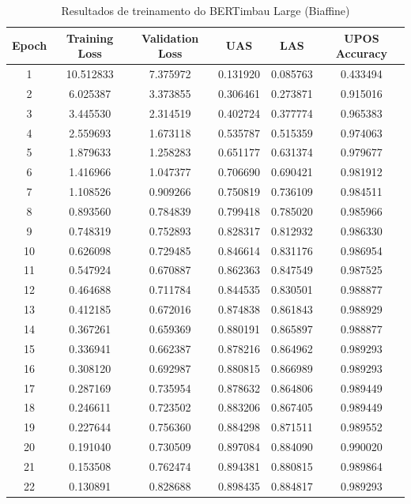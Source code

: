 \begin{table}[ht]
\centering
\caption{Resultados de treinamento do BERTimbau Large (Biaffine)}
\label{tab:bertimbau-large-biaffine}
\begin{tabular}{c c c c c c}
\hline
\textbf{Epoch} & \textbf{Training Loss} & \textbf{Validation Loss} & \textbf{UAS} & \textbf{LAS} & \textbf{UPOS Accuracy} \\
\hline
1 & 10.512833 & 7.375972 & 0.131920 & 0.085763 & 0.433494 \\
2 & 6.025387 & 3.373855 & 0.306461 & 0.273871 & 0.915016 \\
3 & 3.445530 & 2.314519 & 0.402724 & 0.377774 & 0.965383 \\
4 & 2.559693 & 1.673118 & 0.535787 & 0.515359 & 0.974063 \\
5 & 1.879633 & 1.258283 & 0.651177 & 0.631374 & 0.979677 \\
6 & 1.416966 & 1.047377 & 0.706690 & 0.690421 & 0.981912 \\
7 & 1.108526 & 0.909266 & 0.750819 & 0.736109 & 0.984511 \\
8 & 0.893560 & 0.784839 & 0.799418 & 0.785020 & 0.985966 \\
9 & 0.748319 & 0.752893 & 0.828317 & 0.812932 & 0.986330 \\
10 & 0.626098 & 0.729485 & 0.846614 & 0.831176 & 0.986954 \\
11 & 0.547924 & 0.670887 & 0.862363 & 0.847549 & 0.987525 \\
12 & 0.464688 & 0.711784 & 0.844535 & 0.830501 & 0.988877 \\
13 & 0.412185 & 0.672016 & 0.874838 & 0.861843 & 0.988929 \\
14 & 0.367261 & 0.659369 & 0.880191 & 0.865897 & 0.988877 \\
15 & 0.336941 & 0.662387 & 0.878216 & 0.864962 & 0.989293 \\
16 & 0.308120 & 0.692987 & 0.880815 & 0.866989 & 0.989293 \\
17 & 0.287169 & 0.735954 & 0.878632 & 0.864806 & 0.989449 \\
18 & 0.246611 & 0.723502 & 0.883206 & 0.867405 & 0.989449 \\
19 & 0.227644 & 0.756360 & 0.884298 & 0.871511 & 0.989552 \\
20 & 0.191040 & 0.730509 & 0.897084 & 0.884090 & 0.990020 \\
21 & 0.153508 & 0.762474 & 0.894381 & 0.880815 & 0.989864 \\
22 & 0.130891 & 0.828688 & 0.898435 & 0.884817 & 0.989293 \\

\end{tabular}
\end{table}
